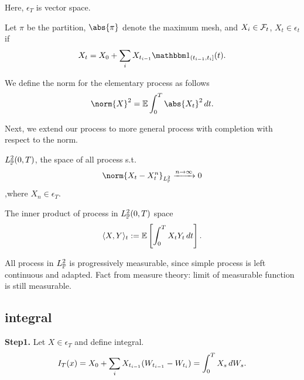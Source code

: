 \begin{rem}
Here, $\epsilon_T$ is vector space.
\end{rem}

\begin{dfn}
Let $\pi$ be the partition, $\abs{\pi}$ denote the maximum mesh, and $X_i\in\mathcal{F}_t$, $X_t \in \epsilon_t$ if 
\begin{equation*}
    X_t = X_0 + \bigs{i}X_{t_{i-1}}\I{(t_{i-1}, t_i]}(t).
\end{equation*}
\end{dfn}

\begin{dfn}
We define the norm for the elementary process as follows
\begin{equation*}
    \norm{X}^2 = \E\int_0^T \abs{X_t}^2 \diff t.
\end{equation*}
\end{dfn}

Next, we extend our process to more general process with completion with respect to the norm.

\begin{dfn}
$L_{\mathbb{P}}^{2}(0,T)$, the space of all process s.t.
\begin{equation*}
    \norm{X_t - X_t^n}_{\lp{2}} \xrightarrow{n\rightarrow \infty} 0
\end{equation*} ,where $X_n \in \epsilon_T$.
\end{dfn}

\begin{dfn}{The inner product of process in $L_{\mathbb{P}}^{2}(0,T)$ space}
\begin{equation*}
    \langle{X},{Y} \rangle_t := \mathbb{E}\left[ \int_0^T X_tY_t \mathop{}\!d t \right].
\end{equation*}
\end{dfn}

\begin{rem}
All process in $L_{\mathbb{P}}^{2}$ is progressively measurable, since simple process is left continuous and adapted. Fact from measure theory: limit of measurable function is still measurable. 
\end{rem}

\subsection{\ito integral}
\textbf{Step1.} Let $X\in\epsilon_T$ and define \ito integral.
\begin{equation*}
    I_T(x) =  X_0 + \sum\limits_{i}X_{t_{i-1}}(W_{t_{i-1}} - W_{t_i}) = \int_0^T X_s \mathop{}\!d W_s.
\end{equation*}

